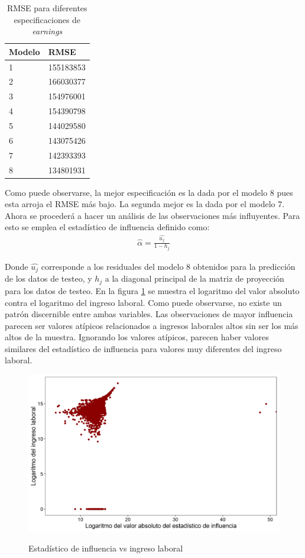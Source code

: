 \documentclass[11pt,a4paper]{article}
\begin{document}
\begin{table}[H]
  \centering
  \caption{RMSE para diferentes especificaciones de \emph{earnings}}
  \label{tab:rmse_punto4}
  \begin{tabular}{@{}ll@{}}
  \toprule
  Modelo & RMSE \\ \midrule
  1 & 155183853 \\
  2 & 166030377 \\
  3 & 154976001 \\
  4 & 154390798 \\
  5 & 144029580 \\
  6 & 143075426 \\
  7 & 142393393 \\
  8 & 134801931 \\ \bottomrule
  \end{tabular}
  \label{tbl:RMSEearnings}
  \end{table}


Como puede observarse, la mejor especificación es la dada por el modelo 8 pues esta arroja el RMSE más bajo. La segunda mejor es la dada por el modelo 7. 
Ahora se procederá a hacer un análisis de las observaciones más influyentes. Para esto se emplea el estadístico de influencia definido como:
\begin{align*}
  \hat{\alpha}=\frac{\hat{u_j}}{1-h_j}
\end{align*}

Donde $\hat{u_j}$ corresponde a los residuales del modelo 8 obtenidos para la predicción de los datos de testeo, y $h_j$ a la diagonal principal de la matriz de proyección para los datos de testeo. En la figura \ref{fig:influencia} se muestra el logaritmo del valor absoluto contra el logaritmo del ingreso laboral. Como puede observarse, no existe un patrón discernible entre ambas variables. Las observaciones de mayor influencia parecen ser valores atípicos relacionados a ingresos laborales altos sin ser los más altos de la muestra. Ignorando los valores atípicos, parecen haber valores similares del estadístico de influencia para valores muy diferentes del ingreso laboral.

\begin{figure}[H]
    \centering
    \caption{Estadístico de influencia vs ingreso laboral}
    \includegraphics[width=\textwidth]{../views/analisis_influencia.png}
    \label{fig:influencia}
\end{figure}
\end{document}
